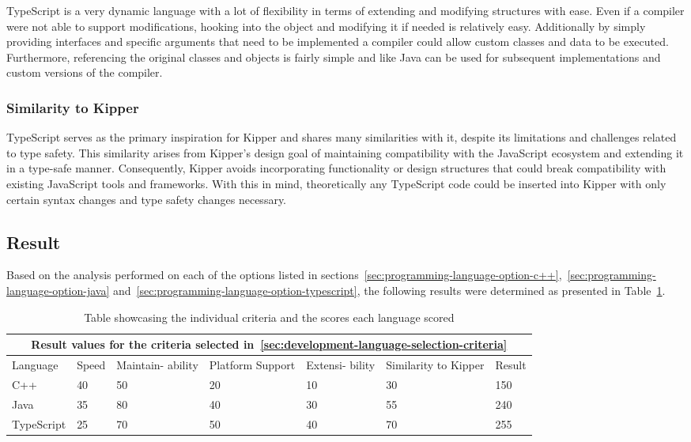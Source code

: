 TypeScript is a very dynamic language with a lot of flexibility in terms of extending and modifying structures with ease. Even if a compiler were not able to support modifications, hooking into the object and modifying it if needed is relatively easy. Additionally by simply providing interfaces and specific arguments that need to be implemented a compiler could allow custom classes and data to be executed. Furthermore, referencing the original classes and objects is fairly simple and like Java can be used for subsequent implementations and custom versions of the compiler.

\subsubsection{Similarity to Kipper}

TypeScript serves as the primary inspiration for Kipper and shares many similarities with it, despite its limitations and challenges related to type safety. This similarity arises from Kipper's design goal of maintaining compatibility with the JavaScript ecosystem and extending it in a type-safe manner. Consequently, Kipper avoids incorporating functionality or design structures that could break compatibility with existing JavaScript tools and frameworks. With this in mind, theoretically any TypeScript code could be inserted into Kipper with only certain syntax changes and type safety changes necessary.

\subsection{Result}

Based on the analysis performed on each of the options listed in sections~\ref{sec:programming-language-option-c++},~\ref{sec:programming-language-option-java} and~\ref{sec:programming-language-option-typescript}, the following results were determined as presented in Table~\ref{tab:programming-language-results}.

\begin{table}[H]
	\centering
	\begin{tabular}{ |p{2cm}|p{1.8cm}|p{1.8cm}|p{1.8cm}|p{1.8cm}|p{1.8cm}|p{1.2cm}|  }
		\hline
		\multicolumn{7}{|c|}{Result values for the criteria selected in~\ref{sec:development-language-selection-criteria}} \\
		\hline
		Language&Speed&Maintain- ability&Platform Support&Extensi- bility&Similarity to Kipper&Result\\
		\hline
		C++&40&50&20&10&30&150\\
		Java&35&80&40&30&55&240\\
		TypeScript&25&70&50&40&70&255\\
		\hline
	\end{tabular}
	\caption{Table showcasing the individual criteria and the scores each language scored}
	\label{tab:programming-language-results}
\end{table}

